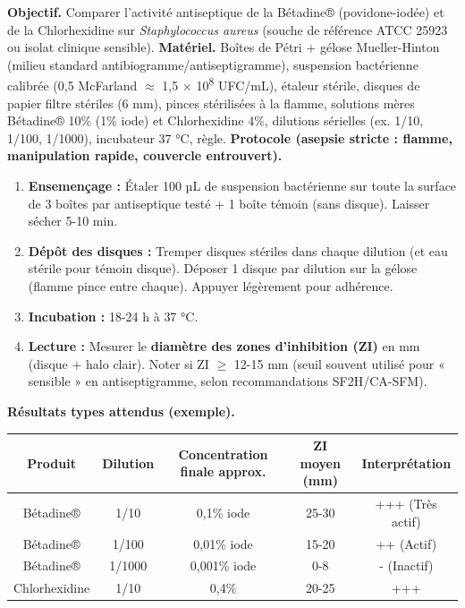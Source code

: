 \documentclass[11pt]{article}
\begin{document}
\begin{experience}
\textbf{Objectif.} Comparer l'activité antiseptique de la Bétadine® (povidone-iodée) et de la Chlorhexidine sur \textit{Staphylococcus aureus} (souche de référence ATCC 25923 ou isolat clinique sensible).
\textbf{Matériel.} Boîtes de Pétri + gélose Mueller-Hinton (milieu standard antibiogramme/antiseptigramme), suspension bactérienne calibrée (0,5 McFarland $\approx$ 1,5 $\times$ 10\textsuperscript{8} UFC/mL), étaleur stérile, disques de papier filtre stériles (6 mm), pinces stérilisées à la flamme, solutions mères Bétadine® 10\% (1\% iode) et Chlorhexidine 4\%, dilutions sérielles (ex. 1/10, 1/100, 1/1000), incubateur 37 °C, règle.
\textbf{Protocole (asepsie stricte : flamme, manipulation rapide, couvercle entrouvert).}
\begin{enumerate}
    \item \textbf{Ensemençage :} Étaler 100 µL de suspension bactérienne sur toute la surface de 3 boîtes par antiseptique testé + 1 boîte témoin (sans disque). Laisser sécher 5-10 min.
    \item \textbf{Dépôt des disques :} Tremper disques stériles dans chaque dilution (et eau stérile pour témoin disque). Déposer 1 disque par dilution sur la gélose (flamme pince entre chaque). Appuyer légèrement pour adhérence.
    \item \textbf{Incubation :} 18-24 h à 37 °C.
    \item \textbf{Lecture :} Mesurer le \textbf{diamètre des zones d'inhibition (ZI)} en mm (disque + halo clair). Noter si ZI $\ge$ 12-15 mm (seuil souvent utilisé pour « sensible » en antiseptigramme, selon recommandations SF2H/CA-SFM).
\end{enumerate}
\textbf{Résultats types attendus (exemple).}
\begin{center}
\begin{tabular}{|c|c|c|c|c|}\hline
\textbf{Produit} & \textbf{Dilution} & \textbf{Concentration finale approx.} & \textbf{ZI moyen (mm)} & \textbf{Interprétation} \\ \hline
Bétadine® & 1/10 & 0,1\% iode & 25-30 & +++ (Très actif) \\ \hline
Bétadine® & 1/100 & 0,01\% iode & 15-20 & ++ (Actif) \\ \hline
Bétadine® & 1/1000 & 0,001\% iode & 0-8 & - (Inactif) \\ \hline
Chlorhexidine & 1/10 & 0,4\% & 20-25 & +++ \\ \hline

\end{tabular}
\end{center}
\end{experience}
\end{document}
